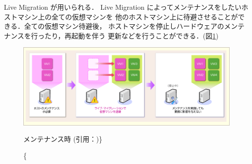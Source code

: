 \documentclass[graduation-thesis]{mlarticle}
\begin{document}
Live Migration が用いられる．
Live Migration によってメンテナンスをしたいホストマシン上の全ての仮想マシンを
他のホストマシン上に待避させることができる．全ての仮想マシン待避後，
ホストマシンを停止しハードウェアのメンテナンスを行ったり，再起動を伴う
更新などを行うことができる．(図\ref{maintenance})
\begin{figure}[H]\begin{center}\includegraphics[width=16.0cm]{./img/maintenance.png}\caption\{ メンテナンス時 (引用：\cite{livemigration})\}\label{maintenance}\end{center}\end{figure}
\end{document}
